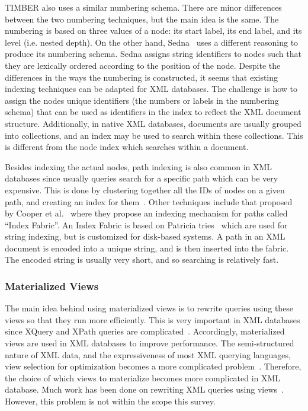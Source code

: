 \documentclass[12pt,a4paper]{article}
\begin{document}
TIMBER also uses a similar numbering schema. There are minor differences between the two numbering techniques, but the main idea is the same. The numbering is
based on three values of a node: its start label, its end label, and its level (i.e. nested depth). On the other hand, Sedna~\cite{taranov2010sedna} uses a
different reasoning to produce its numbering schema. Sedna assigns string identifiers to nodes such that they are lexically ordered according to the position
of the node. Despite the differences in the ways the numbering is constructed, it seems that existing indexing techniques can be adapted for XML databases. The
challenge is how to assign the nodes unique identifiers (the numbers or labels in the numbering schema) that can be used as identifiers in the index to
reflect the XML document structure. Additionally, in native XML databases, documents are usually grouped into collections, and an index may be used to search
within these collections. This is different from the node index which searches within a document.

Besides indexing the actual nodes, path indexing is also common in XML databases since usually queries search for a specific path which can be very expensive.
This is done by clustering together all the IDs of nodes on a given path, and creating an index for them~\cite{milo1999index, arion2008path}. Other techniques
include that proposed by Cooper et al.~\cite{cooper2001} where they propose an indexing mechanism for paths called ``Index Fabric''. An Index Fabric is based on
Patricia tries~\cite{knuth1998} which are used for string indexing, but is customized for disk-based systems. A path in an XML document is encoded into a unique
string, and is then inserted into the fabric. The encoded string is usually very short, and so searching is relatively fast.


\subsubsection{Materialized Views}

The main idea behind using materialized views is to rewrite queries using these views so that they run more efficiently. This is very important in XML
databases since XQuery and XPath queries are complicated~\cite{arion2007structured}. Accordingly, materialized views are used in XML databases to improve
performance. The semi-structured nature of
XML data, and the expressiveness of most XML querying languages, view selection for optimization becomes a more complicated
problem~\cite{tang2009materialized}. Therefore, the choice of which views to materialize becomes more complicated in XML database. Much work has been
done on rewriting XML queries using views~\cite{arion2007structured, balmin2004framework, aouiche2006clustering, tang2008multiple}. However, this problem is not
within the scope this survey.
\end{document}
